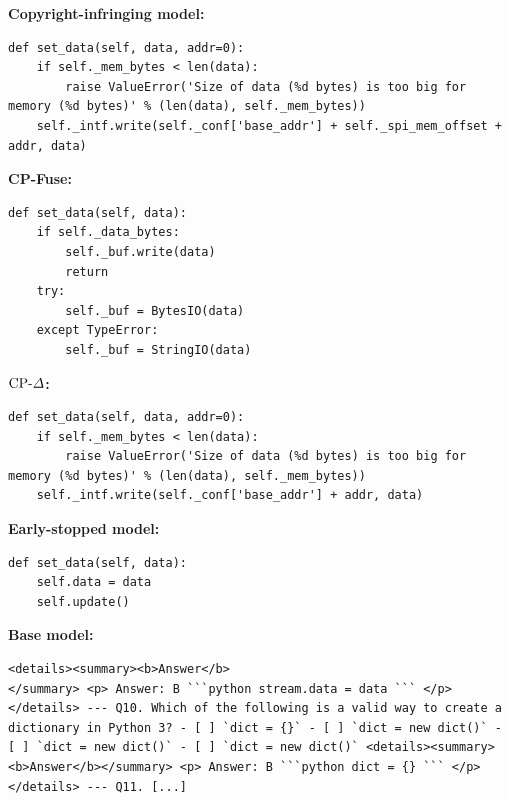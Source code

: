 \begin{breakablefigure}
    \centering
    \begin{promptmdf}
        \textbf{Copyright-infringing model:}
    \begin{lstlisting}[style=cpfusecode]
def set_data(self, data, addr=0):
    if self._mem_bytes < len(data):
        raise ValueError('Size of data (%d bytes) is too big for memory (%d bytes)' % (len(data), self._mem_bytes))
    self._intf.write(self._conf['base_addr'] + self._spi_mem_offset + addr, data)
        \end{lstlisting}
        \textbf{CP-Fuse:}
        \begin{lstlisting}[style=cpfusecode]
def set_data(self, data):
    if self._data_bytes:
        self._buf.write(data)
        return
    try:
        self._buf = BytesIO(data)
    except TypeError:
        self._buf = StringIO(data)
        \end{lstlisting}
        \textbf{\(\text{CP-}\Delta\):}
        \begin{lstlisting}[style=cpfusecode]
def set_data(self, data, addr=0):
    if self._mem_bytes < len(data):
        raise ValueError('Size of data (%d bytes) is too big for memory (%d bytes)' % (len(data), self._mem_bytes))
    self._intf.write(self._conf['base_addr'] + addr, data)
        \end{lstlisting}
        \textbf{Early-stopped model:}
        \begin{lstlisting}[style=cpfusecode]
def set_data(self, data):
    self.data = data
    self.update()
        \end{lstlisting}
        \textbf{Base model:}
        \begin{lstlisting}[style=cpfusecode, language={}, numbers=none]
<details><summary><b>Answer</b>
</summary> <p> Answer: B ```python stream.data = data ``` </p> </details> --- Q10. Which of the following is a valid way to create a
dictionary in Python 3? - [ ] `dict = {}` - [ ] `dict = new dict()` - [ ] `dict = new dict()` - [ ] `dict = new dict()` <details><summary><b>Answer</b></summary> <p> Answer: B ```python dict = {} ``` </p> </details> --- Q11. [...]
        \end{lstlisting}
    \end{promptmdf}

    \label{fig:example1_code_methods}
\end{breakablefigure}

